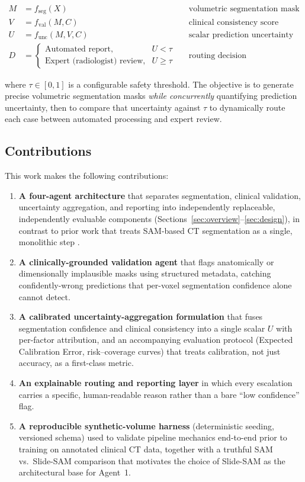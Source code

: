 \documentclass[11pt,a4paper]{article}
\begin{document}
\begin{formulabox}
\begin{align}
M &= f_{\text{seg}}(X) &&\text{volumetric segmentation mask} \label{eq:seg}\\
V &= f_{\text{val}}(M, C) &&\text{clinical consistency score} \label{eq:val}\\
U &= f_{\text{unc}}(M, V, C) &&\text{scalar prediction uncertainty} \label{eq:unc}\\
D &=
\begin{cases}
\text{Automated report}, & U < \tau \\
\text{Expert (radiologist) review}, & U \geq \tau
\end{cases} &&\text{routing decision} \label{eq:route}
\end{align}
\end{formulabox}

\noindent where $\tau \in [0,1]$ is a configurable safety threshold. The objective is to generate precise volumetric segmentation masks \emph{while concurrently} quantifying prediction uncertainty, then to compare that uncertainty against $\tau$ to dynamically route each case between automated processing and expert review.

\subsection{Contributions}
This work makes the following contributions:

\begin{enumerate}[leftmargin=1.4em]
    \item \textbf{A four-agent architecture} that separates segmentation, clinical validation, uncertainty aggregation, and reporting into independently replaceable, independently evaluable components (Sections~\ref{sec:overview}--\ref{sec:design}), in contrast to prior work that treats SAM-based CT segmentation as a single, monolithic step \cite{caroline,slidesam}.
    \item \textbf{A clinically-grounded validation agent} that flags anatomically or dimensionally implausible masks using structured metadata, catching confidently-wrong predictions that per-voxel segmentation confidence alone cannot detect.
    \item \textbf{A calibrated uncertainty-aggregation formulation} that fuses segmentation confidence and clinical consistency into a single scalar $U$ with per-factor attribution, and an accompanying evaluation protocol (Expected Calibration Error, risk--coverage curves) that treats calibration, not just accuracy, as a first-class metric.
    \item \textbf{An explainable routing and reporting layer} in which every escalation carries a specific, human-readable reason rather than a bare ``low confidence'' flag.
    \item \textbf{A reproducible synthetic-volume harness} (deterministic seeding, versioned schema) used to validate pipeline mechanics end-to-end prior to training on annotated clinical CT data, together with a truthful SAM vs.\ Slide-SAM comparison that motivates the choice of Slide-SAM as the architectural base for Agent~1.
\end{enumerate}
\end{document}
